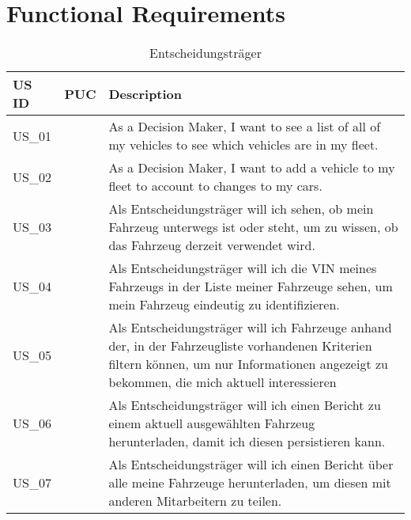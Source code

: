 \chapter{Functional Requirements}

  \sffamily
  \begin{footnotesize}
    \begin{longtable}[i i L]{ p{} p{} p{} }
      \caption                       %
          {Entscheidungsträger} %
          \\
      \toprule
      \textbf{US ID} & \textbf{PUC} & \textbf{Description} \\
      \midrule
      US\_01 & & As a Decision Maker, I want to see a list of all of my vehicles to see which vehicles are in my fleet.\\
      US\_02 & & As a Decision Maker, I want to add a vehicle to my fleet to account to changes to my cars. \\
      US\_03 & & Als Entscheidungsträger will ich sehen, ob mein Fahrzeug unterwegs ist oder steht, um zu wissen, ob das Fahrzeug derzeit verwendet wird. \\
      US\_04 & & Als Entscheidungsträger will ich die VIN meines Fahrzeugs in der Liste meiner Fahrzeuge sehen, um mein Fahrzeug eindeutig zu identifizieren. \\
      US\_05 & & Als Entscheidungsträger will ich Fahrzeuge anhand der, in der Fahrzeugliste vorhandenen Kriterien filtern können, um nur Informationen angezeigt zu bekommen, die mich aktuell interessieren \\
      US\_06 & & Als Entscheidungsträger will ich einen Bericht zu einem aktuell ausgewählten Fahrzeug herunterladen, damit ich diesen persistieren kann. \\
      US\_07 & & Als Entscheidungsträger will ich einen Bericht über alle meine Fahrzeuge herunterladen, um diesen mit anderen Mitarbeitern zu teilen. \\
      \bottomrule
    \end{longtable}
  \end{footnotesize}
  \rmfamily


